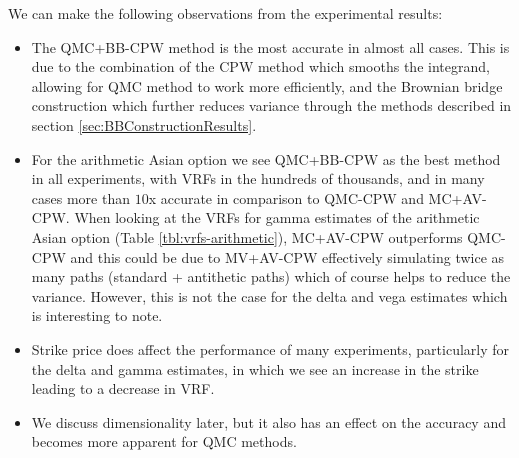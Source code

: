 We can make the following observations from the experimental results:

\begin{itemize}
    \item The QMC+BB-CPW method is the most accurate in almost all cases. This is due to the combination of the CPW method which smooths the integrand, allowing for QMC method to work more efficiently, and the Brownian bridge construction which further reduces variance through the methods described in section \ref{sec:BBConstructionResults}.
    \item For the arithmetic Asian option we see QMC+BB-CPW as the best method in all experiments, with VRFs in the hundreds of thousands, and in many cases more than $10$x accurate in comparison to QMC-CPW and MC+AV-CPW. When looking at the VRFs for gamma estimates of the arithmetic Asian option (Table \ref{tbl:vrfs-arithmetic}), MC+AV-CPW outperforms QMC-CPW and this could be due to MV+AV-CPW effectively simulating twice as many paths (standard + antithetic paths) which of course helps to reduce the variance. However, this is not the case for the delta and vega estimates which is interesting to note.
    \item Strike price does affect the performance of many experiments, particularly for the delta and gamma estimates, in which we see an increase in the strike leading to a decrease in VRF.
    \item We discuss dimensionality later, but it also has an effect on the accuracy and becomes more apparent for QMC methods.
\end{itemize}

